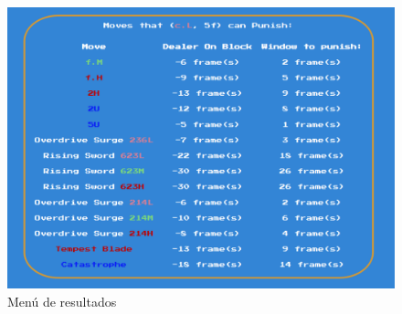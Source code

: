 \begin{center}
    \begin{figure}
        \centering
        \includegraphics[height=0.4\textheight]{figures/Results_menu-object.png}
        \caption{Menú de resultados}
        \label{fig: rslt prt}
    \end{figure}  
\end{center}